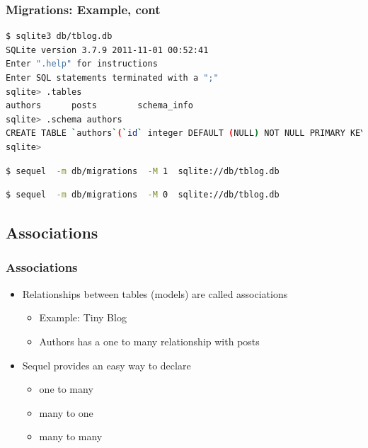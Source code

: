 \documentclass{beamer}
\begin{document}
\begin{frame}[fragile]\frametitle{Migrations: Example, cont} 

  \begin{lstlisting}[language=bash, escapechar={^}]
$ sqlite3 db/tblog.db
SQLite version 3.7.9 2011-11-01 00:52:41
Enter ".help" for instructions
Enter SQL statements terminated with a ";"
sqlite> .tables
authors      posts        schema_info
sqlite> .schema authors
CREATE TABLE `authors`(`id` integer DEFAULT (NULL) NOT NULL PRIMARY KEY, `name` varchar(255) DEFAULT (NULL) NULL, `age` integer);
sqlite> 
  \end{lstlisting}

  \begin{lstlisting}[language=bash, escapechar={^}]
$ sequel  -m db/migrations  -M 1  sqlite://db/tblog.db
  \end{lstlisting}

  \begin{lstlisting}[language=bash, escapechar={^}]
$ sequel  -m db/migrations  -M 0  sqlite://db/tblog.db
  \end{lstlisting}
  
\end{frame}



\subsection{Associations} 
\begin{frame}\frametitle{Associations} 
  \begin{itemize}
    \item Relationships between tables (models) are called associations 
    \begin{itemize}
      \item Example: Tiny Blog
      \item Authors has a one to many relationship with posts
    \end{itemize}
    
    \item Sequel provides an easy way to declare
    \begin{itemize}
      \item one to many
      \item many to one
      \item many to many
    \end{itemize}
    
  \end{itemize}
      
\end{frame}
\end{document}
